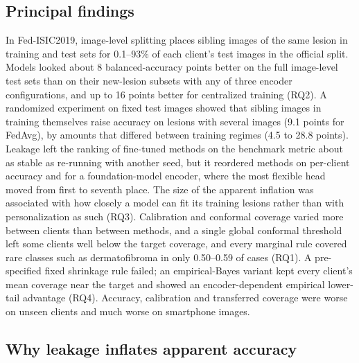 \documentclass[VANCOUVER,Times1COL]{WileyNJDv5}
\begin{document}
\subsection{Principal findings}

In Fed-ISIC2019, image-level splitting places sibling images of the same lesion in training and test sets
for 0.1--93\% of each client's test images in the official split. Models looked about 8 balanced-accuracy
points better on the full image-level test sets than on their new-lesion subsets with any of three encoder
configurations, and up to 16 points better for centralized training (RQ2). A randomized experiment on fixed test images showed that sibling images in training themselves raise
accuracy on lesions with several images (9.1 points for FedAvg), by amounts that differed between training
regimes (4.5 to 28.8 points). Leakage left the
ranking of fine-tuned methods on the benchmark metric about as stable as re-running with another seed, but
it reordered methods on per-client accuracy and for a foundation-model encoder, where the most flexible
head moved from first to seventh place. The size of the apparent inflation was associated with how closely
a model can fit its training lesions rather than with personalization as such (RQ3). Calibration and
conformal coverage varied more between clients than between methods, and a single global conformal
threshold left some clients well below the target coverage, and every marginal rule covered rare classes such as dermatofibroma in only 0.50--0.59 of cases (RQ1). A pre-specified fixed shrinkage rule failed; an empirical-Bayes variant kept every client's mean coverage near the target and showed an encoder-dependent empirical lower-tail advantage (RQ4). Accuracy, calibration and transferred coverage were worse
on unseen clients and much worse on smartphone images.

\subsection{Why leakage inflates apparent accuracy}
\end{document}
